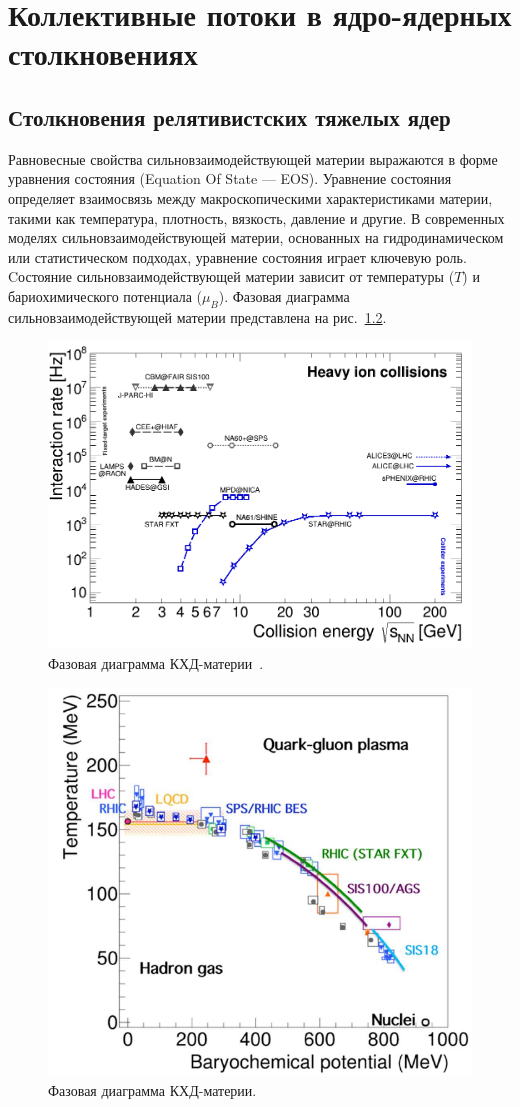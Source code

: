 \chapter{Коллективные потоки в ядро-ядерных столкновениях} \label{chapt1}

\section{Столкновения релятивистских тяжелых ядер}

Равновесные свойства сильновзаимодействующей материи выражаются в форме уравнения состояния (Equation Of State — EOS). 
Уравнение состояния определяет взаимосвязь между макроскопическими характеристиками материи, такими как температура, плотность, вязкость, давление и другие.
В современных моделях сильновзаимодействующей материи, основанных на гидродинамическом или статистическом подходах, уравнение состояния играет ключевую роль.
Cостояние сильновзаимодействующей материи зависит от температуры ($T$) и бариохимического потенциала ($\mu_B$).
Фазовая диаграмма сильновзаимодействующей материи представлена на рис.~\ref{fig:qcd_phase_diagram}.
%
\begin{figure}[h]
    \centering
    \includegraphics[width=0.5\linewidth]{images/hist_rates_detectors_2024_feb.png}
    \caption{Фазовая диаграмма КХД-материи~\cite{Bzdak:2019pkr}.}
    \label{fig:hist_rates_detectors_2024_feb}
\end{figure}
%
\begin{figure}[h]
    \centering
    \includegraphics[width=0.5\linewidth]{images/phase.png}
    \caption{Фазовая диаграмма КХД-материи.}
    \label{fig:qcd_phase_diagram}
\end{figure}

